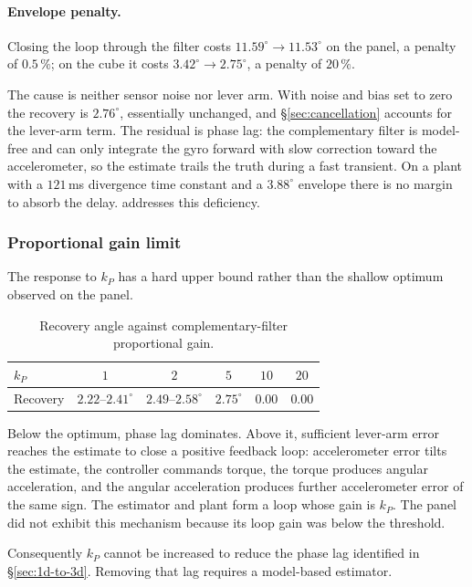 \paragraph{Envelope penalty.} Closing the loop through the filter costs
$11.59^\circ \to 11.53^\circ$ on the panel, a penalty of $0.5\,\%$; on the
cube it costs $3.42^\circ \to 2.75^\circ$, a penalty of $20\,\%$.

The cause is neither sensor noise nor lever arm. With noise and bias set to
zero the recovery is $2.76^\circ$, essentially unchanged, and
\S\ref{sec:cancellation} accounts for the lever-arm term. The residual is
phase lag: the complementary filter is model-free and can only integrate the
gyro forward with slow correction toward the accelerometer, so the estimate
trails the truth during a fast transient. On a plant with a $121$\,ms
divergence time constant and a $3.88^\circ$ envelope there is no margin to
absorb the delay.  addresses this deficiency.

\subsubsection{Proportional gain limit}
\label{sec:kp-edge}

The response to $k_P$ has a hard upper bound rather than the shallow optimum
observed on the panel.

\begin{table}[htbp]
\centering
\small
\begin{tabular}{@{}lccccc@{}}
\toprule
$k_P$ & $1$ & $2$ & $5$ & $10$ & $20$\\
\midrule
Recovery & $2.22$--$2.41^\circ$ & $2.49$--$2.58^\circ$ & $2.75^\circ$
  & $0.00$ & $0.00$\\
\bottomrule
\end{tabular}
\caption{Recovery angle against complementary-filter proportional gain.}
\label{tab:kp-sweep}
\end{table}

Below the optimum, phase lag dominates. Above it, sufficient lever-arm error
reaches the estimate to close a positive feedback loop: accelerometer error
tilts the estimate, the controller commands torque, the torque produces
angular acceleration, and the angular acceleration produces further
accelerometer error of the same sign. The estimator and plant form a loop
whose gain is $k_P$. The panel did not exhibit this mechanism because its
loop gain was below the threshold.

Consequently $k_P$ cannot be increased to reduce the phase lag identified in
\S\ref{sec:1d-to-3d}. Removing that lag requires a model-based estimator.

